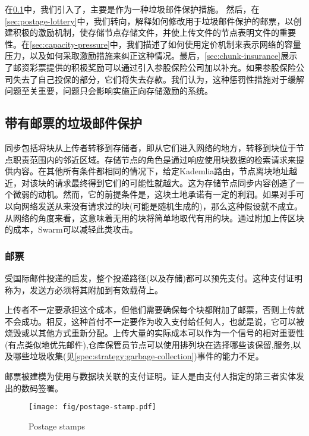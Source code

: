 在\ref{sec:postage-stamps}中，我们引入了，主要是作为一种垃圾邮件保护措施。  
然后，在\ref{sec:postage-lottery}中，我们转向，解释如何修改用于垃圾邮件保护的邮票，以创建积极的激励机制，使存储节点存储文件，并使上传文件的节点表明文件的重要性。在\ref{sec:capacity-pressure}中，我们描述了如何使用定价机制来表示网络的容量压力，以及如何采取激励措施来纠正这种情况。最后，\ref{sec:chunk-insurance}展示了邮资彩票提供的积极奖励可以通过引入参股保险公司加以补充。如果参股保险公司失去了自己投保的部分，它们将失去存款。我们认为，这种惩罚性措施对于缓解问题至关重要，问题只会影响实施正向存储激励的系统。 

\subsection{带有邮票的垃圾邮件保护}\label{sec:postage-stamps}
\green{}

同步包括将块从上传者转移到存储者，即从它们进入网络的地方，转移到块位于节点职责范围内的邻近区域。存储节点的角色是通过响应使用块数据的检索请求来提供内容。在其他所有条件都相同的情况下，给定Kademlia路由，节点离块地址越近，对该块的请求最终得到它们的可能性就越大。这为存储节点同步内容创造了一个微弱的动机。然而，它的前提条件是，这块土地承诺有一定的利润。如果对手可以向网络发送从来没有请求过的块(可能是随机生成的)，那么这种假设就不成立。从网络的角度来看，这意味着无用的块将简单地取代有用的块。通过附加上传区块的成本，Swarm可以减轻此类攻击。


\subsubsection{邮票}

受国际邮件投递的启发，整个投递路径(以及存储)都可以预先支付。这种支付证明称为，发送方必须将其附加到有效载荷上。

上传者不一定要承担这个成本，但他们需要确保每个块都附加了邮票，否则上传就不会成功。相反，这种首付不一定要作为收入支付给任何人，也就是说，它可以被烧毁或以其他方式重新分配。上传大量的实际成本可以作为一个信号的相对重要性(有点类似地优先邮件),仓库保管员节点可以使用排列块在选择哪些该保留,服务,以及哪些垃圾收集(见\ref{spec:strategy:garbage-collection})事件的能力不足。

邮票被建模为使用与数据块关联的支付证明。证人是由支付人指定的第三者实体发出的数码签署。


\begin{figure}[htbp]
\centering
  \texttt{[image: fig/postage-stamp.pdf]}
\caption[Postage stamps  \statusgreen]{Postage stamps}
\label{fig:postage-stamps}
\end{figure}

